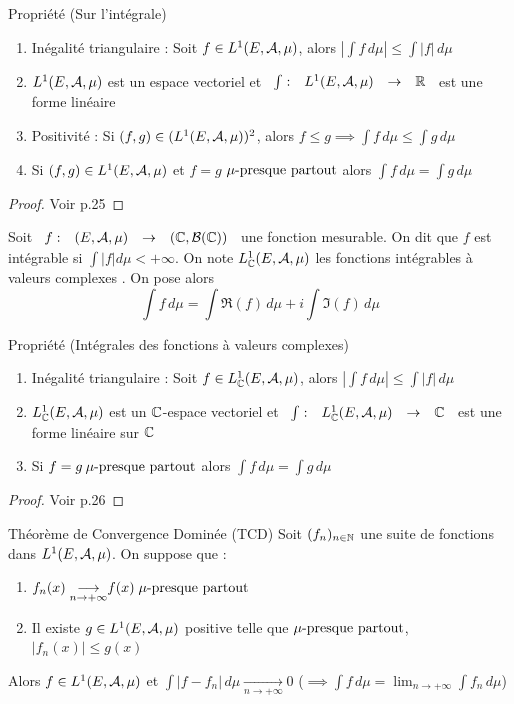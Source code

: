 \documentclass[]{report}
\begin{document}
\begin{prop}{Propriété (Sur l'intégrale)}{}
    \begin{enumerate}
        \item Inégalité triangulaire : Soit $f\in L^1(E,\mathcal{A},\mu)$, alors $|\int f\,d\mu|\le\int|f|\,d\mu$
        \item $L^1(E,\mathcal{A},\mu)$ est un espace vectoriel et $\begin{array}{ccccc} \int : & L^1(E,\mathcal{A},\mu) & \to & \mathbb{R} \end{array}$ est une forme linéaire
        \item Positivité : Si $(f,g)\in(L^1(E,\mathcal{A},\mu))^2$, alors $f\le g\implies\int f\,d\mu\le\int g\,d\mu$
        \item Si $(f,g)\in L^1(E,\mathcal{A},\mu)$ et $f=g$ $\mu\text{-presque partout}$ alors $\int f\,d\mu=\int g\,d\mu$
    \end{enumerate}
\end{prop}

\begin{proof}{}{}
    Voir p.25
\end{proof}

\begin{df}{}{}
    Soit $\begin{array}{ccccc} f : & (E,\mathcal{A},\mu) & \to & (\mathbb{C},\mathcal{B}(\mathbb{C})) \end{array}$ une fonction mesurable. On dit que $f$ est intégrable si $\int|f|d\mu<+\infty$. On note $L_{\mathbb{C}}^1(E,\mathcal{A},\mu)$ les fonctions intégrables à valeurs complexes . On pose alors
    $$\int f\,d\mu=\int \Re(f)\,d\mu+i\int\Im(f)\,d\mu$$
\end{df}

\begin{prop}{Propriété (Intégrales des fonctions à valeurs complexes)}{}
    \begin{enumerate}
        \item Inégalité triangulaire : Soit $f\in L_{\mathbb{C}}^1(E,\mathcal{A},\mu)$, alors $|\int f\,d\mu|\le\int |f|\,d\mu$
        \item $L_{\mathbb{C}}^1(E,\mathcal{A},\mu)$ est un $\mathbb{C}$-espace vectoriel et $\begin{array}{ccccc} \int : & L_{\mathbb{C}}^1(E,\mathcal{A},\mu) & \to & \mathbb{C} \end{array}$ est une forme linéaire sur $\mathbb{C}$
        \item Si $f=g\: \mu\text{-presque partout}$ alors $\int f\,d\mu=\int g\,d\mu$
    \end{enumerate}
\end{prop}

\begin{proof}{}{}
    Voir p.26
\end{proof}

\begin{tm}{Théorème de Convergence Dominée (TCD)}{}
    Soit $(f_n)_{n\in\mathbb{N}}$ une suite de fonctions dans $L^1(E,\mathcal{A},\mu)$. On suppose que :
    \begin{enumerate}
        \item $\displaystyle{f_n(x)\underset{n\to+\infty}{\longrightarrow}}f(x)\;\mu\text{-presque partout}$
        \item Il existe $g\in L^1(E,\mathcal{A},\mu)$ positive telle que $\mu\text{-presque partout}$, $|f_n(x)|\le g(x)$
    \end{enumerate}
    Alors $f\in L^1(E,\mathcal{A},\mu)$ et $\displaystyle{\int |f-f_n|\,d\mu\underset{n\to+\infty}{\longrightarrow}0}$ ($\displaystyle{\implies \int f\,d\mu=\lim_{n\to+\infty}}\int f_n\,d\mu$)
\end{tm}
\end{document}
